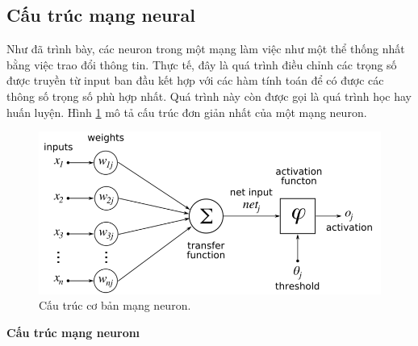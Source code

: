 	\subsection{Cấu trúc mạng neural}
	Như đã trình bày, các neuron trong một mạng làm việc như một thể thống nhất bằng việc trao đổi thông tin. Thực tế, đây là quá trình điều chỉnh các trọng số được truyền từ input ban đầu kết hợp với các hàm tính toán để có được các thông số trọng số phù hợp nhất. Quá trình này còn được gọi là quá trình học hay huấn luyện. Hình \ref{fig:NN} mô tả cấu trúc đơn giản nhất của một mạng neuron.
	\begin{figure}[h!]
		\centering
		\includegraphics[scale=0.4]{charts/NN.png}
		\caption{Cấu trúc cơ bản mạng neuron.\cite{img-perceptron}}
		\label{fig:NN}
	\end{figure}
	\textbf{Cấu trúc mạng neuron\i}
	
